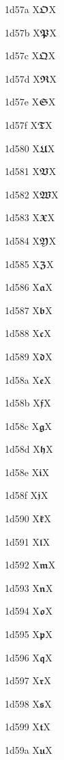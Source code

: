 \documentclass[11pt]{article}
\begin{document}
1d57a X{\ensuremath{\mathbffrak{O}}}X

1d57b X{\ensuremath{\mathbffrak{P}}}X

1d57c X{\ensuremath{\mathbffrak{Q}}}X

1d57d X{\ensuremath{\mathbffrak{R}}}X

1d57e X{\ensuremath{\mathbffrak{S}}}X

1d57f X{\ensuremath{\mathbffrak{T}}}X

1d580 X{\ensuremath{\mathbffrak{U}}}X

1d581 X{\ensuremath{\mathbffrak{V}}}X

1d582 X{\ensuremath{\mathbffrak{W}}}X

1d583 X{\ensuremath{\mathbffrak{X}}}X

1d584 X{\ensuremath{\mathbffrak{Y}}}X

1d585 X{\ensuremath{\mathbffrak{Z}}}X

1d586 X{\ensuremath{\mathbffrak{a}}}X

1d587 X{\ensuremath{\mathbffrak{b}}}X

1d588 X{\ensuremath{\mathbffrak{c}}}X

1d589 X{\ensuremath{\mathbffrak{d}}}X

1d58a X{\ensuremath{\mathbffrak{e}}}X

1d58b X{\ensuremath{\mathbffrak{f}}}X

1d58c X{\ensuremath{\mathbffrak{g}}}X

1d58d X{\ensuremath{\mathbffrak{h}}}X

1d58e X{\ensuremath{\mathbffrak{i}}}X

1d58f X{\ensuremath{\mathbffrak{j}}}X

1d590 X{\ensuremath{\mathbffrak{k}}}X

1d591 X{\ensuremath{\mathbffrak{l}}}X

1d592 X{\ensuremath{\mathbffrak{m}}}X

1d593 X{\ensuremath{\mathbffrak{n}}}X

1d594 X{\ensuremath{\mathbffrak{o}}}X

1d595 X{\ensuremath{\mathbffrak{p}}}X

1d596 X{\ensuremath{\mathbffrak{q}}}X

1d597 X{\ensuremath{\mathbffrak{r}}}X

1d598 X{\ensuremath{\mathbffrak{s}}}X

1d599 X{\ensuremath{\mathbffrak{t}}}X

1d59a X{\ensuremath{\mathbffrak{u}}}X
\end{document}
